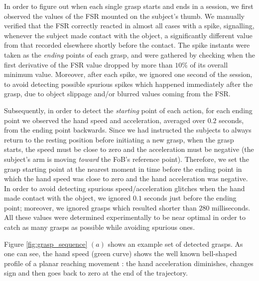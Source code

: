 In order to figure out when each single grasp starts and ends in a
session, we first observed the values of the FSR mounted on the
subject's thumb. We manually verified that the FSR correctly reacted
in almost all cases with a spike, signalling, whenever the subject
made contact with the object, a significantly different value from
that recorded elsewhere shortly before the contact. The spike instants
were taken as the \emph{ending} points of each grasp, and were
gathered by checking when the first derivative of the FSR value
dropped by more than $10\%$ of its overall minimum value. Moreover,
after each spike, we ignored one second of the session, to avoid 
detecting possible spurious spikes which happened immediately after
the grasp, due to object slippage and/or blurred values coming from
the FSR.

Subsequently, in order to detect the \emph{starting} point of each
action, for each ending point we observed the hand speed and
acceleration, averaged over $0.2$ seconds, from the ending point
backwards. Since we had instructed the subjects to always return to
the resting position before initiating a new grasp, when the grasp
starts, the speed must be close to zero and the acceleration must be
negative (the subject's arm is moving \emph{toward} the FoB's
reference point). Therefore, we set the grasp starting point at the
nearest moment in time before the ending point in which the hand speed
was close to zero and the hand acceleration was negative. In order to
avoid detecting spurious speed/acceleration glitches when the hand
made contact with the object, we ignored $0.1$ seconds just before the
ending point; moreover, we ignored grasps which resulted shorter than
$280$ milliseconds. All these values were determined experimentally to
be near optimal in order to catch as many grasps as possible while
avoiding spurious ones.

Figure \ref{fig:grasp_sequence} $(a)$ shows an example set of detected
grasps. As one can see, the hand speed (green curve) shows the well
known bell-shaped profile of a planar reaching movement \cite{morasso-81}: 
the hand acceleration diminishes, changes sign and then goes back to zero at 
the end of the trajectory.

